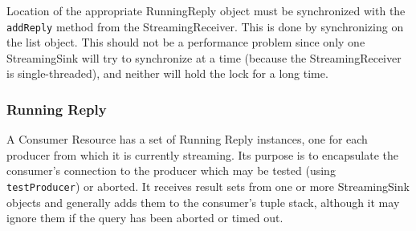 Location of the appropriate RunningReply object must be synchronized with the
\texttt{addReply} method from the StreamingReceiver. This is done by synchronizing
on the list object. This should not be a performance problem since only one
StreamingSink will try to synchronize at a time (because the StreamingReceiver is 
single-threaded), and neither will hold the lock for a long time.

\subsubsection*{Running Reply}

A Consumer Resource has a set of Running Reply instances, one for each
producer from which it is currently streaming. Its purpose is to encapsulate
the consumer's connection to the producer which may be tested (using \texttt{testProducer})
or aborted. It receives result sets from one or more StreamingSink objects and
generally adds them to the consumer's tuple stack, although it may ignore them
if the query has been aborted or timed out.

